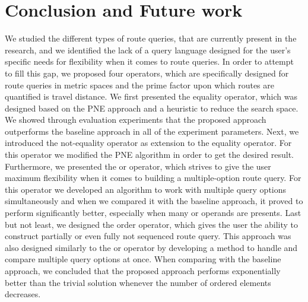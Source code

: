 \chapter{Conclusion and Future work}
\label{sec:conclusion}
\enlargethispage*{30pt}

We studied the different types of route queries, that are currently present in the research, and we identified the lack of a query language designed for the user's specific needs for flexibility when it comes to route queries. In order to attempt to fill this gap, we proposed four operators, which are specifically designed for route queries in metric spaces and the prime factor upon which routes are quantified is travel distance. 
We first presented the equality operator, which was designed based on the PNE approach \cite{OSR} and a heuristic to reduce the search space. We showed through evaluation experiments that the proposed approach outperforms the baseline approach in all of the experiment parameters. Next, we introduced the not-equality operator as extension to the equality operator. For this operator we modified the PNE algorithm in order to get the desired result. Furthermore, we presented the or operator, which strives to give the user maximum flexibility when it comes to building a multiple-option route query. For this operator we developed an algorithm to work with multiple query options simultaneously and when we compared it with the baseline approach, it proved to perform significantly better, especially when many or operands are presents. Last but not least, we designed the order operator, which gives the user the ability to construct partially or even fully not sequenced route query. This approach was also designed similarly to the or operator by developing a method to handle and compare multiple query options at once. When comparing with the baseline approach, we concluded that the proposed approach performs exponentially better than the trivial solution whenever the number of ordered elements decreases.

